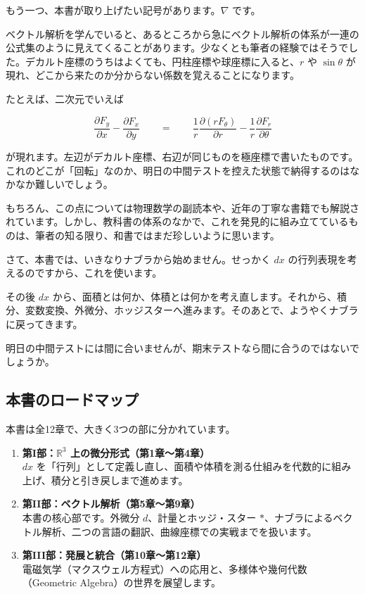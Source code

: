 \documentclass[a4paper,12pt,openany]{book}
\providecommand{\tightlist}{%
  \setlength{\itemsep}{0pt}\setlength{\parskip}{0pt}}
\begin{document}
もう一つ、本書が取り上げたい記号があります。\(\nabla\) です。

ベクトル解析を学んでいると、あるところから急にベクトル解析の体系が一連の公式集のように見えてくることがあります。少なくとも筆者の経験ではそうでした。デカルト座標のうちはよくても、円柱座標や球座標に入ると、\(r\)
や \(\sin\theta\)
が現れ、どこから来たのか分からない係数を覚えることになります。

たとえば、二次元でいえば

\[
\frac{\partial F_y}{\partial x}-\frac{\partial F_x}{\partial y}
\qquad=\qquad
\frac{1}{r}\frac{\partial (r F_\theta)}{\partial r}-\frac{1}{r}\frac{\partial F_r}{\partial \theta}
\]

が現れます。左辺がデカルト座標、右辺が同じものを極座標で書いたものです。これのどこが「回転」なのか、明日の中間テストを控えた状態で納得するのはなかなか難しいでしょう。

もちろん、この点については物理数学の副読本や、近年の丁寧な書籍でも解説されています。しかし、教科書の体系のなかで、これを発見的に組み立てているものは、筆者の知る限り、和書ではまだ珍しいように思います。

さて、本書では、いきなりナブラから始めません。せっかく \(dx\)
の行列表現を考えるのですから、これを使います。

その後 \(dx\)
から、面積とは何か、体積とは何かを考え直します。それから、積分、変数変換、外微分、ホッジスターへ進みます。そのあとで、ようやくナブラに戻ってきます。

明日の中間テストには間に合いませんが、期末テストなら間に合うのではないでしょうか。

\par\vspace{0.35em}\par

\hypertarget{ux672cux66f8ux306eux30edux30fcux30c9ux30deux30c3ux30d7}{%
\subsection{本書のロードマップ}\label{ux672cux66f8ux306eux30edux30fcux30c9ux30deux30c3ux30d7}}

本書は全12章で、大きく3つの部に分かれています。

\begin{enumerate}
\def\labelenumi{\arabic{enumi}.}
\tightlist
\item
  \textbf{第I部：$\mathbb{R}^3$ 上の微分形式（第1章〜第4章）}\\
  \(dx\)
  を「行列」として定義し直し、面積や体積を測る仕組みを代数的に組み上げ、積分と引き戻しまで進めます。
\item
  \textbf{第II部：ベクトル解析（第5章〜第9章）}\\
  本書の核心部です。外微分 \(d\)、計量とホッジ・スター
  \(\ast\)、ナブラによるベクトル解析、二つの言語の翻訳、曲線座標での実戦までを扱います。
\item
  \textbf{第III部：発展と統合（第10章〜第12章）}\\
  電磁気学（マクスウェル方程式）への応用と、多様体や幾何代数（Geometric
  Algebra）の世界を展望します。
\end{enumerate}
\end{document}
